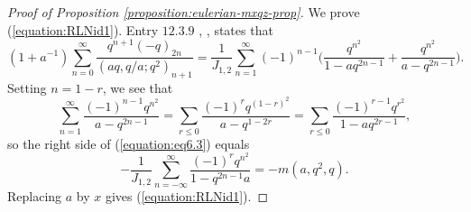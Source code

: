 \documentclass[12pt,reqno]{amsart}
\theoremstyle{remark}
\theoremstyle{definition}
\numberwithin{theorem}{section} \numberwithin{equation}{section}
\numberwithin{example}{section}
\begin{document}
\begin{proof}[Proof of Proposition \ref{proposition:eulerian-mxqz-prop}]We prove (\ref{equation:RLNid1}).  Entry $12.3.9$ \cite {ABI}, \cite[p. 5]{RLN}, states that
\begin{equation}
(1+a^{-1})\sum_{n=0}^{\infty}\frac{q^{n+1}(-q)_{2n}}{(aq,q/a;q^2)_{n+1}}=\frac{1}{J_{1,2}}\sum_{n=1}^{\infty}(-1)^{n-1}\Big ( \frac{q^{n^2}}{1-aq^{2n-1}}+\frac{q^{n^2}}{a-q^{2n-1}}\Big ).\label{equation:eq6.3}
\end{equation}
Setting $n=1-r$, we see that
\begin{equation}
\sum_{n=1}^{\infty}\frac{(-1)^{n-1}q^{n^2}}{a-q^{2n-1}}=\sum_{r\le 0}\frac{(-1)^{r}q^{(1-r)^2}}{a-q^{1-2r}}=\sum_{r\le 0}\frac{(-1)^{r-1}q^{r^2}}{1-aq^{2r-1}},
\end{equation}
so the right side of (\ref{equation:eq6.3}) equals
\begin{equation}
-\frac{1}{J_{1,2}}\sum_{n=-\infty}^{\infty}\frac{(-1)^rq^{n^2}}{1-q^{2n-1}a}=-m(a,q^2,q).
\end{equation}
Replacing $a$ by $x$ gives (\ref{equation:RLNid1}).


\end{proof}
\end{document}
